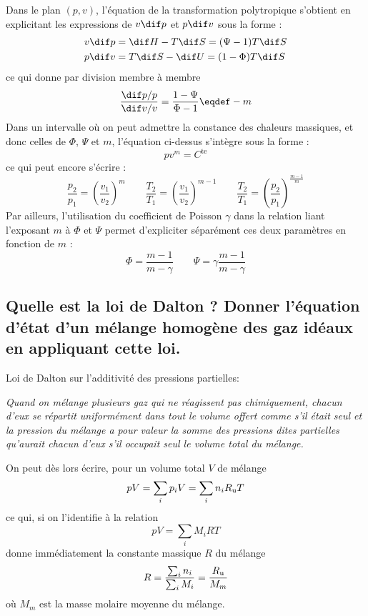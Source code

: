 Dans le plan $(p,v)$, l'équation de la transformation polytropique s'obtient
en explicitant les expressions de $v \dif p$ et $p \dif v$ sous la forme :
\begin{align*}
	v\d{p} &= \d{H} - T\d{S} = (\Psi-1)T\d{S} \\
	p\d{v} &= T\d{S} - \d{U} = (1-\Phi)T\d{S}
\end{align*}
ce qui donne par division membre à membre
\[ \frac{\d{p}/p}{\d{v}/v} = \frac{1-\Psi}{\Phi-1} \eqdef -m \]
Dans un intervalle où on peut admettre la constance des chaleurs massiques, et donc celles de $\Phi$, $\Psi$ et $m$, l'équation ci-dessus s'intègre sous la forme :
\begin{equation} pv^m = C^\text{te}\end{equation}
ce qui peut encore s'écrire :
\begin{equation} \frac{p_2}{p_1} = \left(\frac{v_1}{v_2}\right)^{m} \qquad \frac{T_2}{T_1} = \left(\frac{v_1}{v_2}\right)^{m-1} \qquad \frac{T_2}{T_1} = \left(\frac{p_2}{p_1}\right)^{\frac{m-1}{m}} \end{equation}
Par ailleurs, l'utilisation du coefficient de Poisson $\gamma$ dans la relation liant l'exposant $m$ à $\Phi$ et $\Psi$ permet d'expliciter séparément ces deux paramètres en fonction de $m$ :
\begin{equation} \Phi = \frac{m-1}{m-\gamma} \qquad \Psi = \gamma\frac{m-1}{m-\gamma} \end{equation}

\subsection{Quelle est la loi de Dalton ?
Donner l'équation d'état d'un mélange homogène des gaz idéaux en appliquant cette loi.}
Loi de Dalton sur l'additivité des pressions partielles:
\begin{center}
	\textit{Quand on mélange plusieurs gaz qui ne réagissent pas chimiquement,
	chacun d'eux se répartit uniformément dans tout le volume offert comme s'il était seul
	et la pression du mélange a pour valeur la somme des pressions dites partielles
	qu'aurait chacun d'eux s'il occupait seul le volume total du mélange.}
\end{center}
On peut dès lors écrire, pour un volume total $V$ de mélange
\[ pV = \sum_i p_i V = \sum_i n_i R_{\mathrm{u}} T \]
ce qui, si on l'identifie à la relation
\[ pV = \sum_i M_i R T \]
donne immédiatement la constante massique $R$ du mélange
\[ R = \frac{\sum_i n_i}{\sum_i M_i} = \frac{R_{\mathrm{u}}}{M_m} \]
où $M_m$ est la masse molaire moyenne du mélange.

